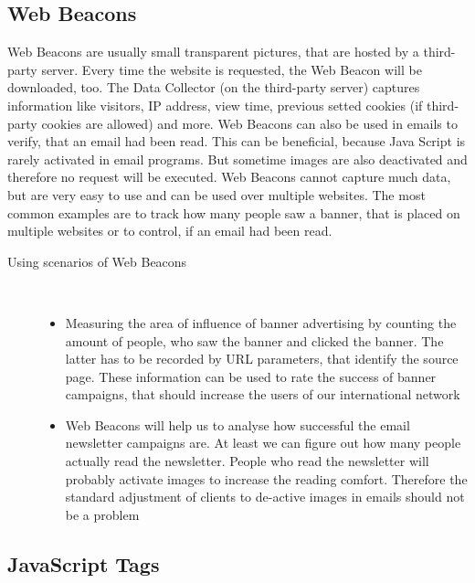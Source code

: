 \subsection{Web Beacons} %
\label{sub:web_beacons}
Web Beacons are usually small transparent pictures, that are hosted by a third-party server. Every time the website is requested, the Web Beacon will be downloaded, too. The Data Collector (on the third-party server) captures information like visitors, IP address, view time, previous setted cookies (if third-party cookies are allowed) and more. Web Beacons can also be used in emails to verify, that an email had been read. This can be beneficial, because Java Script is rarely activated in email programs. But sometime images are also deactivated and therefore no request will be executed. Web Beacons cannot capture much data, but are very easy to use and can be used over multiple websites. The most common examples are to track how many people saw a banner, that is placed on multiple websites or to control, if an email had been read.\citep[p. 28-30]{Kaushik07}

\begin{description}
   \item[Using scenarios of Web Beacons]~\par
   \begin{itemize}
      \item Measuring the area of influence of banner advertising by counting the amount of people, who saw the banner and clicked the banner. The latter has to be recorded by URL parameters, that identify the source page. These information can be used to rate the success of banner campaigns, that should increase the users of our international network
      \item Web Beacons will help us to analyse how successful the email newsletter campaigns are. At least we can figure out how many people actually read the newsletter. People who read the newsletter will probably activate images to increase the reading comfort. Therefore the standard adjustment of clients to de-active images in emails should not be a problem
   \end{itemize}
\end{description}

\subsection{JavaScript Tags} %
\label{sub:javascript_tags}

